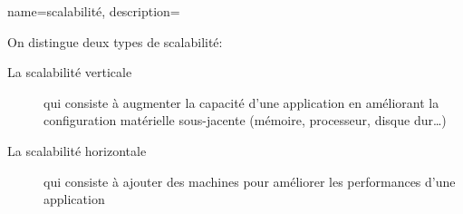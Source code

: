 
{
  name=scalabilité,
  description={On distingue deux types de scalabilité:
\begin{description}
\item[La scalabilité verticale] qui consiste à augmenter la capacité d'une application en améliorant la configuration matérielle sous-jacente (mémoire, processeur, disque dur…)
\item[La scalabilité horizontale] qui consiste à ajouter des machines pour améliorer les performances d'une application
\end{description}}
}

